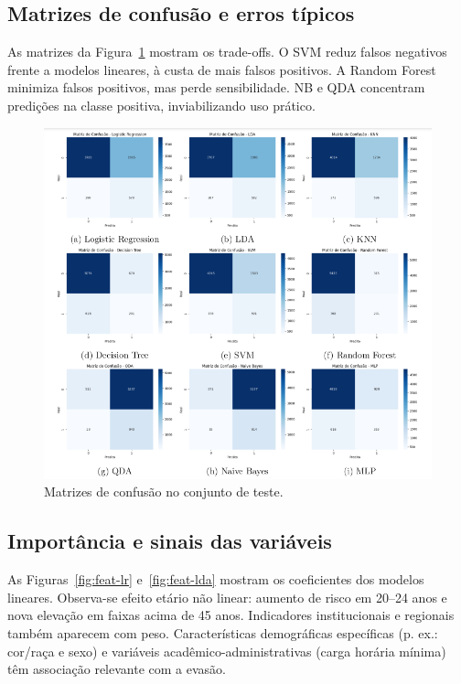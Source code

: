 \documentclass[english, spanish, brazilian]{RBIEarticle} %
\begin{document}
\subsection{Matrizes de confusão e erros típicos}

As matrizes da Figura~\ref{fig:cm-grid} mostram os trade-offs. O SVM reduz falsos negativos frente a modelos lineares, à custa de mais falsos positivos. A Random Forest minimiza falsos positivos, mas perde sensibilidade. NB e QDA concentram predições na classe positiva, inviabilizando uso prático.

\begin{figure}[H]\centering
    \includegraphics[width=1\textwidth]{images/todas-matrizes.png}
    \caption{Matrizes de confusão no conjunto de teste.}
    \label{fig:cm-grid}
\end{figure}

\subsection{Importância e sinais das variáveis}

As Figuras~\ref{fig:feat-lr} e~\ref{fig:feat-lda} mostram os coeficientes dos modelos lineares. Observa-se efeito etário não linear: aumento de risco em 20–24 anos e nova elevação em faixas acima de 45 anos. Indicadores institucionais e regionais também aparecem com peso. Características demográficas específicas (p. ex.: cor/raça e sexo) e variáveis acadêmico-administrativas (carga horária mínima) têm associação relevante com a evasão.
\end{document}
